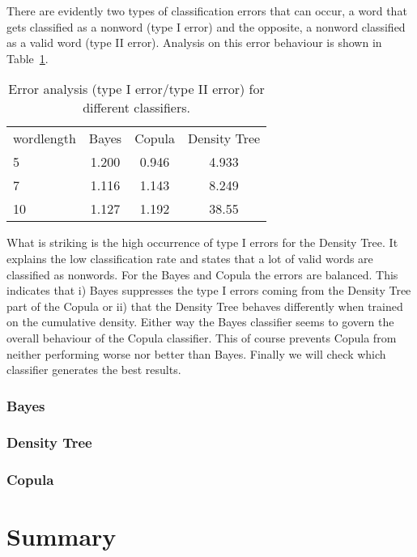 \documentclass[draft]{article}
\begin{document}
There are evidently two types of classification errors that can occur, a word that gets classified
as a nonword (type I error) and the opposite, a nonword classified as a valid word (type II error).
Analysis on this error behaviour is shown in Table~\ref{tab8}.

\begin{table}[h]
	\centering
	\begin{tabular}{l c c c }
		wordlength	& Bayes		& Copula	& Density Tree	\\
		5			&	1.200	& 0.946		& 4.933			\\
	 	7			&   1.116	& 1.143		& 8.249			\\
		10 			& 	1.127	& 1.192		& 38.55			\\
	\end{tabular}
	\caption{Error analysis (type I error/type II error) for different classifiers.}
	\label{tab8}
\end{table}

What is striking is the high occurrence of type I errors for the Density Tree.
It explains the low classification rate and states that a lot of valid words are classified as nonwords.
For the Bayes and Copula the errors are balanced. This indicates that i) Bayes suppresses the type I errors
coming from the Density Tree part of the Copula or ii) that the Density Tree behaves differently
when trained on the cumulative density.
Either way the Bayes classifier seems to govern the overall behaviour of the Copula classifier.
This of course prevents Copula from neither performing worse nor better than Bayes.
\newline
Finally we will check which classifier generates the best results.

\subsubsection{Bayes}

\subsubsection{Density Tree}

\subsubsection{Copula}


\section{Summary}
\end{document}
